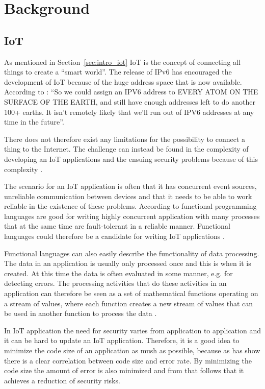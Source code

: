 \chapter{Background}

\section{IoT}
As mentioned in Section~\ref{sec:intro_iot} IoT is the concept of connecting all things to create a “smart world”. The release of IPv6 has encouraged the development of IoT because of the huge address space that is now available. According to \citet{leibson_2008}: “So we could assign an IPV6 address to EVERY ATOM ON THE SURFACE OF THE EARTH, and still have enough addresses left to do another 100+ earths. It isn’t remotely likely that we’ll run out of IPV6 addresses at any time in the future”.

There does not therefore exist any limitations for the possibility to connect a thing to the Internet. The challenge can instead be found in the complexity of developing an IoT applications and the ensuing security problems because of this complexity \citep{sivieri2012wsn}.

The scenario for an IoT application is often that it has concurrent event sources, unreliable communication between devices and that it needs to be able to work reliable in the existence of these problems. According to \citet{armstrong2010erlang} functional programming languages are good for writing highly concurrent application with many processes that at the same time are fault-tolerant in a reliable manner. Functional languages could therefore be a candidate for writing IoT applications \citep{haenisch2016case}. 

Functional languages can also easily describe the functionality of data processing. The data in an application is usually only processed once and this is when it is created. At this time the data is often evaluated in some manner, e.g. for detecting errors. The processing activities that do these activities in an application can therefore be seen as a set of mathematical functions operating on a stream of values, where each function creates a new stream of values that can be used in another function to process the data \citep{haenisch2016case}. 

In IoT application the need for security varies from application to application and it can be hard to update an IoT application. Therefore, it is a good idea to minimize the code size of an application as mush as possible, because as \citet{ray2014large} has show there is a clear correlation between code size and error rate. By minimizing the code size the amount of error is also minimized and from that follows that it achieves a reduction of security risks. 

